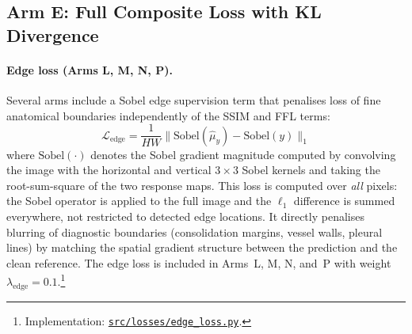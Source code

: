 \documentclass[12pt, a4paper, twoside, openright]{book}
\begin{document}
\subsection{Arm E: Full Composite Loss with KL Divergence}
\label{sec:methods:loss:composite}

\paragraph{Edge loss (Arms L, M, N, P).}
Several arms include a Sobel edge supervision term that penalises loss of fine anatomical boundaries independently of the SSIM and FFL terms:
\begin{equation}
\mathcal{L}_{\mathrm{edge}} = \frac{1}{HW}\bigl\|\mathrm{Sobel}(\hat{\mu}_y) - \mathrm{Sobel}(y)\bigr\|_1
\end{equation}
where $\mathrm{Sobel}(\cdot)$ denotes the Sobel gradient magnitude computed by convolving the image with the horizontal and vertical $3\times3$ Sobel kernels and taking the root-sum-square of the two response maps. This loss is computed over \emph{all} pixels: the Sobel operator is applied to the full image and the $\ell_1$ difference is summed everywhere, not restricted to detected edge locations. It directly penalises blurring of diagnostic boundaries (consolidation margins, vessel walls, pleural lines) by matching the spatial gradient structure between the prediction and the clean reference. The edge loss is included in Arms~L, M, N, and~P with weight $\lambda_{\mathrm{edge}} = 0.1$.\footnote{Implementation: \href{https://github.com/teklesam/ppva_hformer_codebase/blob/main/src/losses/edge_loss.py}{\texttt{src/losses/edge\_loss.py}}.}
\end{document}
